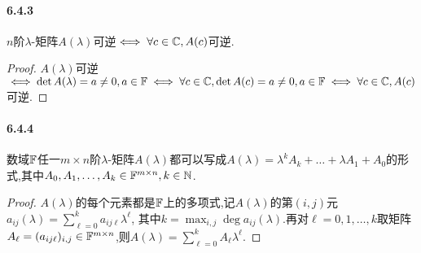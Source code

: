 \documentclass[11pt]{article}
\begin{document}
\paragraph{6.4.3}$n$阶$\lambda$-矩阵$A(\lambda)$可逆$\iff \forall c\in\mathbb{C}, A(c)$可逆.
\begin{proof}
    $A(\lambda)$可逆$\iff \det A(\lambda)=a\neq 0, a\in \mathbb{F} \iff \forall c\in \mathbb{C}, \det A(c)=a\neq 0, a\in \mathbb{F}\iff \forall c\in \mathbb{C}, A(c)$可逆.
\end{proof}
\paragraph{6.4.4}数域$\mathbb{F}$任一$m\times n$阶$\lambda$-矩阵$A(\lambda)$都可以写成$A(\lambda)=\lambda^kA_k+\dots+\lambda A_1+A_0$的形式,其中$A_0,A_1,\dots,A_k\in \mathbb{F}^{m\times n}, k\in\mathbb{N}$.
\begin{proof}
    $A(\lambda)$的每个元素都是$\mathbb{F}$上的多项式,记$A(\lambda)$的第$(i,j)$元$a_{ij}(\lambda)=\sum_{\ell=0}^{k}a_{ij\ell}\lambda^{\ell}$, 其中$k=\max_{i,j}\deg a_{ij}(\lambda)$.再对$\ell=0,1,\dots,k$取矩阵$A_\ell=(a_{ij\ell})_{i,j}\in \mathbb{F}^{m\times n}$,则$A(\lambda)=\sum_{\ell=0}^{k}A_\ell \lambda^\ell$.
\end{proof}
\end{document}
